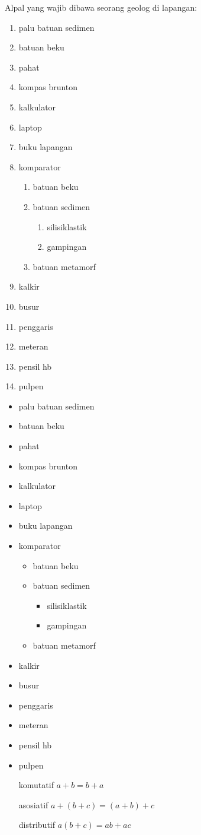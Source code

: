 \documentclass[11pt]{article}
\begin{document}
Alpal yang wajib dibawa seorang geolog di lapangan:

\begin{enumerate}
\item palu batuan sedimen
\item batuan beku
\item pahat
\item kompas brunton
\item kalkulator
\item laptop
\item buku lapangan
\item komparator
	\begin{enumerate}
	\item batuan beku
	\item batuan sedimen
		\begin{enumerate}
		\item silisiklastik
		\item gampingan
		\end{enumerate}
	\item batuan metamorf
	\end{enumerate}
\item kalkir
\item busur
\item penggaris
\item meteran
\item pensil hb
\item pulpen
\end{enumerate}

\begin{itemize}
\item palu batuan sedimen
\item batuan beku
\item pahat
\item kompas brunton
\item kalkulator
\item laptop
\item buku lapangan
\item komparator
	\begin{itemize}
	\item batuan beku
	\item batuan sedimen
		\begin{itemize}
		\item silisiklastik
		\item gampingan
		\end{itemize}
	\item batuan metamorf
	\end{itemize}
\item kalkir
\item busur
\item penggaris
\item meteran
\item pensil hb
\item pulpen
\end{itemize}

\begin{enumerate}
\item[komutatif] $a+b=b+a$
\item[asosiatif] $a+(b+c)=(a+b)+c$
\item[distributif] $a(b+c)=ab+ac$
\end{enumerate}
\end{document}
